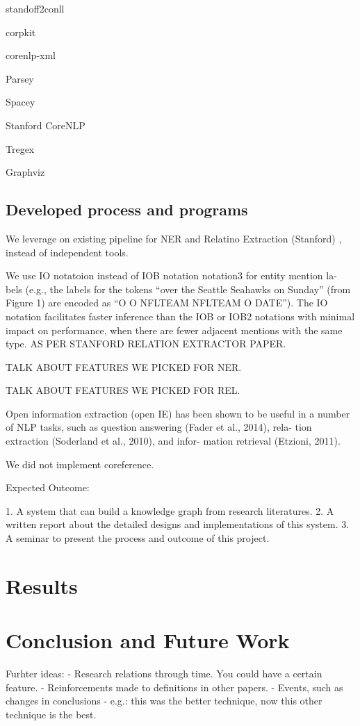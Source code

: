 \documentclass[11pt,a4paper,openright]{memoir}
\begin{document}
standoff2conll

corpkit

corenlp-xml

Parsey

Spacey

Stanford CoreNLP

Tregex

Graphviz


%
%
%
%


\section{Developed process and programs}

We leverage on existing pipeline for NER and Relatino Extraction (Stanford) , instead of independent tools.

We use IO notatoion instead of IOB notation  notation3 for entity mention la- bels (e.g., the labels for the tokens “over the Seattle Seahawks on Sunday” (from Figure 1) are encoded as “O O NFLTEAM NFLTEAM O DATE”). The IO notation facilitates faster inference than the IOB or IOB2 notations with minimal impact on performance, when there are fewer adjacent mentions with the same type. AS PER STANFORD RELATION EXTRACTOR PAPER.

TALK ABOUT FEATURES WE PICKED FOR NER.

TALK ABOUT FEATURES WE PICKED FOR REL.

Open information extraction (open IE) has been shown to be useful in a number of NLP tasks, such as question answering (Fader et al., 2014), rela- tion extraction (Soderland et al., 2010), and infor- mation retrieval (Etzioni, 2011).

We did not implement coreference.

Expected Outcome:

1. A system that can build a knowledge graph from research literatures.  
2. A written report about the detailed designs and implementations of this system.
3. A seminar to present the process and outcome of this project.


%
%
%
%


\chapter{Results}


%
%
%
%


\chapter{Conclusion and Future Work}

Furhter ideas:
- Research relations through time. You could have a certain feature.
- Reinforcements made to definitions in other papers.
- Events, such as changes in conclusions - e.g.: this was the better technique, now this other technique is the best.

\backmatter

\printbibliography

\appendix
\end{document}
